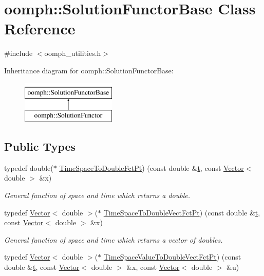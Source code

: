 \hypertarget{classoomph_1_1SolutionFunctorBase}{}\section{oomph\+:\+:Solution\+Functor\+Base Class Reference}
\label{classoomph_1_1SolutionFunctorBase}


{\ttfamily \#include $<$oomph\+\_\+utilities.\+h$>$}

Inheritance diagram for oomph\+:\+:Solution\+Functor\+Base\+:\begin{figure}[H]
\begin{center}
\leavevmode
\includegraphics[height=2.000000cm]{classoomph_1_1SolutionFunctorBase}
\end{center}
\end{figure}
\subsection*{Public Types}
\begin{DoxyCompactItemize}
\item 
typedef double($\ast$ \hyperlink{classoomph_1_1SolutionFunctorBase_a6da5b9aea59f09e01378860ff559c3bb}{Time\+Space\+To\+Double\+Fct\+Pt}) (const double \&\hyperlink{cfortran_8h_af6f0bd3dc13317f895c91323c25c2b8f}{t}, const \hyperlink{classoomph_1_1Vector}{Vector}$<$ double $>$ \&x)
\begin{DoxyCompactList}\small\item\em General function of space and time which returns a double. \end{DoxyCompactList}\item 
typedef \hyperlink{classoomph_1_1Vector}{Vector}$<$ double $>$($\ast$ \hyperlink{classoomph_1_1SolutionFunctorBase_a6df07384ce36c784c7befe7d7bf4a606}{Time\+Space\+To\+Double\+Vect\+Fct\+Pt}) (const double \&\hyperlink{cfortran_8h_af6f0bd3dc13317f895c91323c25c2b8f}{t}, const \hyperlink{classoomph_1_1Vector}{Vector}$<$ double $>$ \&x)
\begin{DoxyCompactList}\small\item\em General function of space and time which returns a vector of doubles. \end{DoxyCompactList}\item 
typedef \hyperlink{classoomph_1_1Vector}{Vector}$<$ double $>$($\ast$ \hyperlink{classoomph_1_1SolutionFunctorBase_aca237d543e590a388b771aea22d3aad6}{Time\+Space\+Value\+To\+Double\+Vect\+Fct\+Pt}) (const double \&\hyperlink{cfortran_8h_af6f0bd3dc13317f895c91323c25c2b8f}{t}, const \hyperlink{classoomph_1_1Vector}{Vector}$<$ double $>$ \&x, const \hyperlink{classoomph_1_1Vector}{Vector}$<$ double $>$ \&u)
\end{DoxyCompactItemize}
